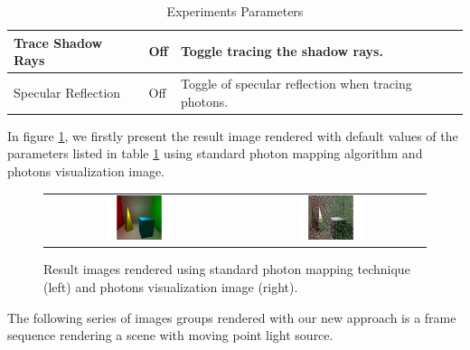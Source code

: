 \begin{table}[Ht]
\begin{center}
\begin{tabular}{p{5cm}p{3cm}p{5cm}}
	\hline
	
	Trace Shadow Rays			&		Off					& 		Toggle tracing the shadow rays. \\

	\hline

	Specular Reflection		&		Off					&		Toggle of specular reflection when tracing photons. \\

	\hline
	
	\end{tabular}
\end{center}
\caption{Experiments Parameters}
\label{tab:expr_params}
\end{table}

In figure \ref{fig:pm_global}, we firstly present the result image rendered with default values of the parameters listed in table \ref{tab:expr_params} using standard photon mapping algorithm and photons visualization image.

\begin{figure}[htp]
\begin{center}
	\begin{tabular}{c | c}
		\includegraphics*[width=0.35\textwidth]{imgs/pq_ref.pdf} &
		\includegraphics*[width=0.35\textwidth]{imgs/pqv_ref.pdf}
	\end{tabular}
    \renewcommand{\thefigure}{\thechapter.\arabic{figure}}
    \caption[Rendered images and photons visualization with standard photon mapping technique]{Result images rendered using standard photon mapping technique (left) and photons visualization image (right).}
    \label{fig:pm_global}
\end{center}
\end{figure}

The following series of images groups rendered with our new approach is a frame sequence rendering a scene with moving point light source. %

